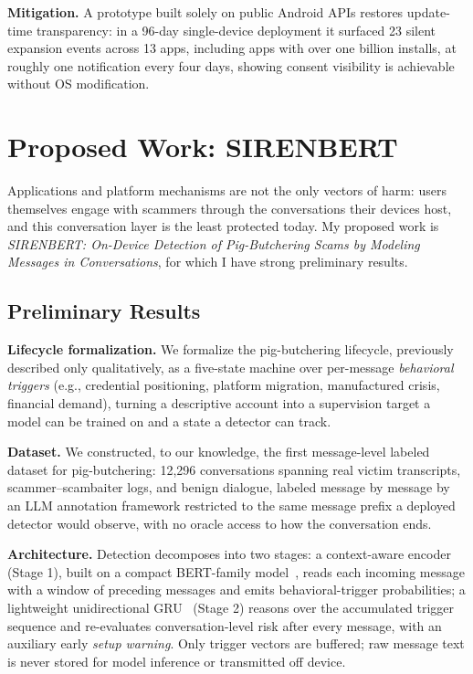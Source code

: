 \documentclass[letterpaper,11pt]{article}
\begin{document}
\textbf{Mitigation.} A prototype built solely on public Android APIs
restores update-time transparency: in a 96-day single-device
deployment it surfaced 23 silent expansion events across 13 apps,
including apps with over one billion installs, at roughly one
notification every four days, showing consent visibility is achievable
without OS modification.

\section{Proposed Work: SIRENBERT}
\label{sec:proposed}

Applications and platform mechanisms are not the only vectors of harm:
users themselves engage with scammers through the conversations their
devices host, and this conversation layer is the least protected
today. My proposed work is \emph{SIRENBERT: On-Device Detection of
Pig-Butchering Scams by Modeling Messages in Conversations}, for which
I have strong preliminary results.

\subsection{Preliminary Results}
\label{sec:sirenbert}

\textbf{Lifecycle formalization.} We formalize the pig-butchering
lifecycle, previously described only qualitatively, as a five-state
machine over per-message \emph{behavioral triggers} (e.g., credential
positioning, platform migration, manufactured crisis, financial
demand), turning a descriptive account into a supervision target a
model can be trained on and a state a detector can track.

\textbf{Dataset.} We constructed, to our knowledge, the first
message-level labeled dataset for pig-butchering: 12,296 conversations
spanning real victim transcripts, scammer--scambaiter logs, and benign
dialogue, labeled message by message by an LLM annotation framework
restricted to the same message prefix a deployed detector would
observe, with no oracle access to how the conversation ends.

\textbf{Architecture.} Detection decomposes into two stages: a
context-aware encoder (Stage 1), built on a compact BERT-family
model~\cite{devlin2019bert,sanh2019distilbert}, reads each incoming
message with a window of preceding messages and emits
behavioral-trigger probabilities; a lightweight unidirectional
GRU~\cite{cho2014gru} (Stage 2) reasons over the accumulated trigger
sequence and re-evaluates conversation-level risk after every message,
with an auxiliary early \emph{setup warning}. Only trigger vectors are
buffered; raw message text is never stored for model inference or
transmitted off device.
\end{document}
